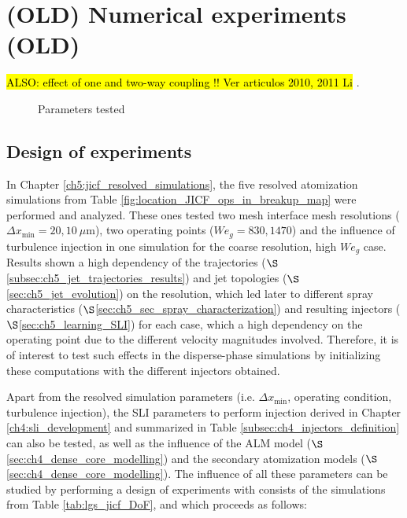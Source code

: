 \clearpage

\section{(OLD) Numerical experiments (OLD)}

\hl{ALSO: effect of one and two-way coupling !! Ver articulos 2010, 2011 Li }.

%
\begin{figure}[h!]	
	\centering
	\caption{Parameters tested}
	\label{fig:dispersed_phase_sli_parameters}
\end{figure}


\subsection{Design of experiments}

In Chapter \ref{ch5:jicf_resolved_simulations}, the five resolved atomization simulations from Table \ref{fig:location_JICF_ops_in_breakup_map} were performed and analyzed. These ones tested two mesh interface mesh resolutions ($\Delta x_\mathrm{min} = 20, 10~\mu$m), two operating points ($We_g = 830, 1470$) and the influence of turbulence injection in one simulation for the coarse resolution, high $We_g$ case. Results shown a high dependency of the trajectories ($\S$\ref{subsec:ch5_jet_trajectories_results}) and jet topologies ($\S$\ref{sec:ch5_jet_evolution}) on the resolution, which led later to different spray characteristics ($\S$\ref{sec:ch5_sec_spray_characterization}) and resulting injectors ($\S$\ref{sec:ch5_learning_SLI}) for each case, which a high dependency on the operating point due to the different velocity magnitudes involved. Therefore, it is of interest to test such effects in the disperse-phase simulations by initializing these computations with the different injectors obtained.

Apart from the resolved simulation parameters (i.e. $\Delta x_\mathrm{min}$, operating condition, turbulence injection), the SLI parameters to perform injection derived in Chapter \ref{ch4:sli_development} and summarized in Table \ref{subsec:ch4_injectors_definition} can also be tested, as well as the influence of the ALM model ($\S$\ref{sec:ch4_dense_core_modelling}) and the secondary atomization models ($\S$\ref{sec:ch4_dense_core_modelling}). The influence of all these parameters can be studied by performing a design of experiments with consists of the simulations from Table \ref{tab:lgs_jicf_DoF}, and which proceeds as follows: 


